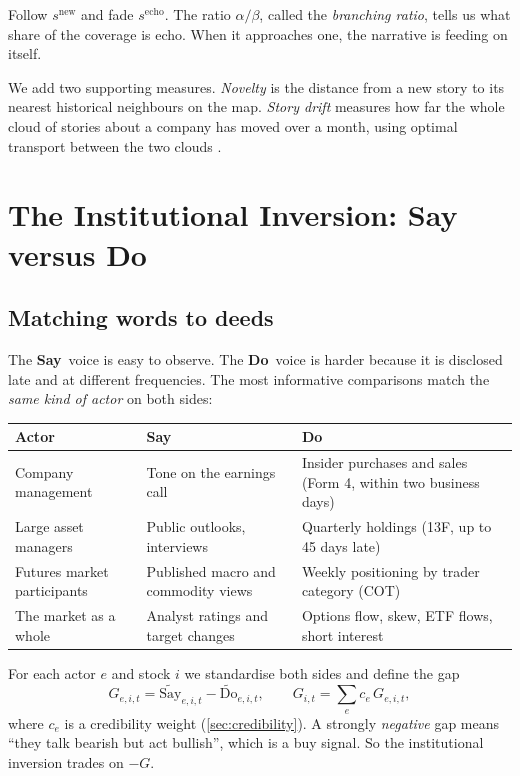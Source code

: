 \documentclass[11pt,a4paper]{article}
\theoremstyle{plain}
\theoremstyle{definition}
\newcommand{\SAY}{\textcolor{say}{\textbf{Say}}}
\newcommand{\DO}{\textcolor{do}{\textbf{Do}}}
\begin{document}
\begin{keyidea}
Follow $s^{\text{new}}$ and fade $s^{\text{echo}}$. The ratio $\alpha/\beta$, called the \emph{branching ratio}, tells us what share of the coverage is echo. When it approaches one, the narrative is feeding on itself.
\end{keyidea}

We add two supporting measures. \emph{Novelty} is the distance from a new story to its nearest historical neighbours on the map. \emph{Story drift} measures how far the whole cloud of stories about a company has moved over a month, using optimal transport between the two clouds \citep{cuturi2013}.

\section{The Institutional Inversion: Say versus Do}\label{sec:saydo}

\subsection{Matching words to deeds}

The \SAY\ voice is easy to observe. The \DO\ voice is harder because it is disclosed late and at different frequencies. The most informative comparisons match the \emph{same kind of actor} on both sides:

\begin{center}
\small
\begin{tabularx}{\textwidth}{@{}lXX@{}}
\toprule
Actor & \SAY & \DO \\
\midrule
Company management & Tone on the earnings call & Insider purchases and sales (Form 4, within two business days) \\
Large asset managers & Public outlooks, interviews & Quarterly holdings (13F, up to 45 days late) \\
Futures market participants & Published macro and commodity views & Weekly positioning by trader category (COT) \\
The market as a whole & Analyst ratings and target changes & Options flow, skew, ETF flows, short interest \\
\bottomrule
\end{tabularx}
\end{center}

For each actor $e$ and stock $i$ we standardise both sides and define the gap
\begin{equation}
  G_{e,i,t} = \widetilde{\text{Say}}_{e,i,t} - \widetilde{\text{Do}}_{e,i,t}, \qquad
  G_{i,t} = \sum_e c_e\, G_{e,i,t},
\end{equation}
where $c_e$ is a credibility weight (\cref{sec:credibility}). A strongly \emph{negative} gap means ``they talk bearish but act bullish'', which is a buy signal. So the institutional inversion trades on $-G$.
\end{document}
